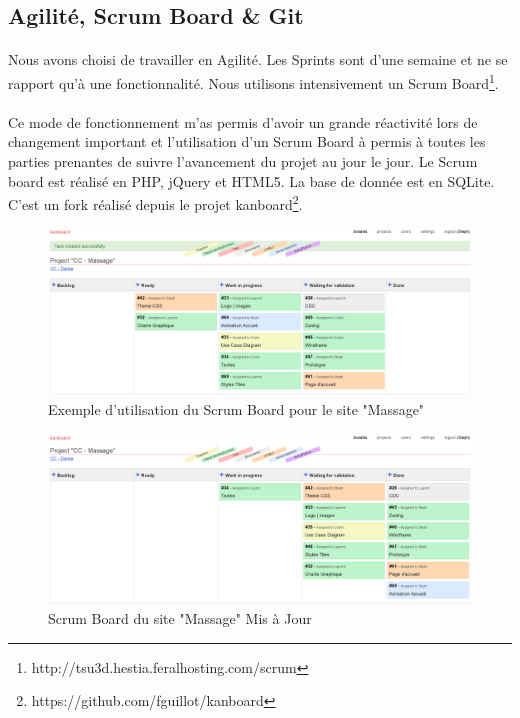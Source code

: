 \documentclass[11pt,a4paper]{report}
\begin{document}
		\subsection{Agilité, Scrum Board \& Git}
			\paragraph*{}Nous avons choisi de travailler en Agilité. Les Sprints sont d'une semaine et ne se rapport qu'à une fonctionnalité. Nous utilisons intensivement un Scrum Board\footnote{http://tsu3d.hestia.feralhosting.com/scrum}.
			\paragraph*{}Ce mode de fonctionnement m'as permis d'avoir un grande réactivité lors de changement important et l'utilisation d'un Scrum Board à permis à toutes les parties prenantes de suivre l'avancement du projet au jour le jour.
			Le Scrum board est réalisé en PHP, jQuery et HTML5. La base de donnée est en SQLite. C'est un fork réalisé depuis le projet kanboard\footnote{https://github.com/fguillot/kanboard}.
			\begin{figure}[H]
				\centering
				\includegraphics[width=\textwidth]{kanban1.eps}
				\caption[Kanban Board]{Exemple d'utilisation du Scrum Board pour le site "Massage"}
				\label{fig:Kanban Board}
			\end{figure}
			\begin{figure}[H]
				\centering
				\includegraphics[width=\textwidth]{kanban2.eps}
				\caption[Kanban Board]{Scrum Board du site "Massage" Mis à Jour}
				\label{fig:Kanban Board v2}
			\end{figure}
\end{document}
